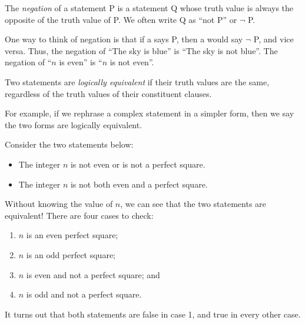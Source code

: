 \documentclass{tufte-book}
\begin{document}
\begin{definition}
  The \emph{negation} of a statement P is a statement Q whose truth value is always the opposite of the truth value of P. We often write Q as ``not P'' or $\neg$ P.
\end{definition}
One way to think of negation is that if a \knave says P, then a \knight would say $\neg$ P, and vice versa. Thus, the negation of ``The sky is blue'' is ``The sky is not blue''. The negation of ``$n$ is even'' is ``$n$ is not even''.

\begin{definition}
  Two statements are \emph{logically equivalent}  if their truth values are the same, regardless of the truth values of their constituent clauses. 
\end{definition}
For example, if we rephrase a complex statement in a simpler form, then we say the two forms are logically equivalent. 

\begin{example}
  Consider the two statements below:
  \begin{itemize}
      \item The integer $n$ is not even or is not a perfect square.
      \item The integer $n$ is not both even and a perfect square.
  \end{itemize}
  Without knowing the value of $n$, we can see that the two statements are equivalent! There are four cases to check:
  \begin{enumerate}
      \item $n$ is an even perfect square;
      \item $n$ is an odd perfect square;
      \item $n$ is even and not a perfect square; and
      \item $n$ is odd and not a perfect square.
  \end{enumerate}
  It turns out that both statements are false in case 1, and true in every other case.
\end{example}
\end{document}

